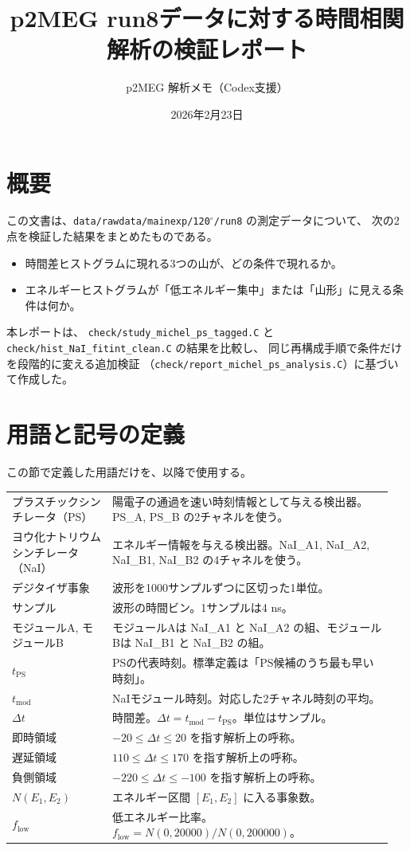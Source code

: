 \documentclass[a4paper,11pt]{jsarticle}
\title{p2MEG run8データに対する時間相関解析の検証レポート}
\author{p2MEG 解析メモ（Codex支援）}
\date{2026年2月23日}
\begin{document}
\maketitle

\section{概要}
この文書は、\texttt{data/rawdata/mainexp/120$^\circ$/run8} の測定データについて、
次の2点を検証した結果をまとめたものである。

\begin{itemize}
  \item 時間差ヒストグラムに現れる3つの山が、どの条件で現れるか。
  \item エネルギーヒストグラムが「低エネルギー集中」または「山形」に見える条件は何か。
\end{itemize}

本レポートは、
\texttt{check/study\_michel\_ps\_tagged.C} と
\texttt{check/hist\_NaI\_fitint\_clean.C} の結果を比較し、
同じ再構成手順で条件だけを段階的に変える追加検証
（\texttt{check/report\_michel\_ps\_analysis.C}）に基づいて作成した。

\section{用語と記号の定義}
この節で定義した用語だけを、以降で使用する。

\begin{longtable}{p{0.25\linewidth}p{0.70\linewidth}}
プラスチックシンチレータ（PS） & 陽電子の通過を速い時刻情報として与える検出器。PS\_A, PS\_B の2チャネルを使う。 \\
ヨウ化ナトリウムシンチレータ（NaI） & エネルギー情報を与える検出器。NaI\_A1, NaI\_A2, NaI\_B1, NaI\_B2 の4チャネルを使う。 \\
デジタイザ事象 & 波形を1000サンプルずつに区切った1単位。 \\
サンプル & 波形の時間ビン。1サンプルは4 ns。 \\
モジュールA, モジュールB & モジュールAは NaI\_A1 と NaI\_A2 の組、モジュールBは NaI\_B1 と NaI\_B2 の組。 \\
$ t_{\mathrm{PS}} $ & PSの代表時刻。標準定義は「PS候補のうち最も早い時刻」。 \\
$ t_{\mathrm{mod}} $ & NaIモジュール時刻。対応した2チャネル時刻の平均。 \\
$ \Delta t $ & 時間差。$\Delta t = t_{\mathrm{mod}} - t_{\mathrm{PS}}$。単位はサンプル。 \\
即時領域 & $-20 \le \Delta t \le 20$ を指す解析上の呼称。 \\
遅延領域 & $110 \le \Delta t \le 170$ を指す解析上の呼称。 \\
負側領域 & $-220 \le \Delta t \le -100$ を指す解析上の呼称。 \\
$N(E_1,E_2)$ & エネルギー区間 $[E_1,E_2]$ に入る事象数。 \\
$f_{\mathrm{low}}$ & 低エネルギー比率。$f_{\mathrm{low}} = N(0,20000) / N(0,200000)$。 \\
\end{longtable}
\end{document}
